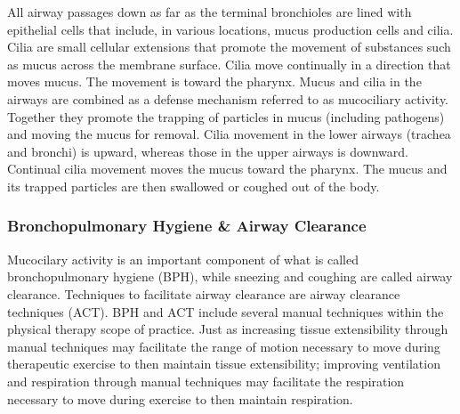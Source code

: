 All airway passages down as far as the terminal bronchioles are lined with epithelial cells that include, in various locations, mucus production cells and cilia. Cilia are small cellular extensions that promote the movement of substances such as mucus across the membrane surface. Cilia move continually in a direction that moves mucus. The movement is toward the pharynx. Mucus and cilia in the airways are combined as a defense mechanism referred to as mucociliary activity. Together they promote the trapping of particles in mucus (including pathogens) and moving the mucus for removal. Cilia movement in the lower airways (trachea and bronchi) is upward, whereas those in the upper airways is downward. Continual cilia movement moves the mucus toward the pharynx. The mucus and its trapped particles are then swallowed or coughed out of the body.

\subsubsection{Bronchopulmonary Hygiene \& Airway Clearance}
Mucocilary activity is an important component of what is called bronchopulmonary hygiene (BPH), while sneezing and coughing are called airway clearance. Techniques to facilitate airway clearance are airway clearance techniques (ACT). BPH and ACT include several manual techniques within the physical therapy scope of practice.\footnotemark{} Just as increasing tissue extensibility through manual techniques may facilitate the range of motion necessary to move during therapeutic exercise to then maintain tissue extensibility; improving ventilation and respiration through manual techniques may facilitate the respiration necessary to move during exercise to then maintain respiration.  

